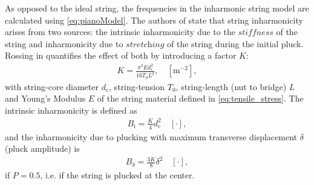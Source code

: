 \documentclass{article}
\begin{document}
\begin{sloppy}
As opposed to the ideal string, the frequencies in the inharmonic string model are calculated using \eqref{eq:pianoModel}. The authors of \cite{coltShank} state that string inharmonicity arises from two sources: the intrinsic inharmonicity due to the $\textit{stiffness}$ of the string and inharmonicity due to $\textit{stretching}$ of the string during the initial pluck. Rossing in \cite{rossing:science_of_string_instruments} quantifies the effect of both by introducing a factor $K$:
\begin{align}
    K = \frac {\pi^3 E d_\text{c}^2}{16 T_0 L^2}, \quad [\text{m}^{-2}],
\end{align}
with string-core diameter $d_\text{c}$, string-tension $T_0$, string-length (nut to bridge) $L$ and Young's Modulus $E$ of the string material defined in \eqref{eq:tensile_stress}. The intrinsic inharmonicity is defined as
\begin{align}\label{eq:intrinsicInharmonicity}
    B_\text{i} = \frac {K}{4} d_\text{c}^2  \quad [\cdot],
\end{align}
and the inharmonicity due to plucking with maximum transverse displacement $\delta$ (pluck amplitude) is  
\begin{align}\label{eq:displacementInharmonicity}
    B_\delta = \frac {3K}{8} \delta^2 \quad [\cdot],
\end{align}
if $P=0.5$, i.e. if the string is plucked at the center.
%
%

\end{sloppy}
\end{document}
